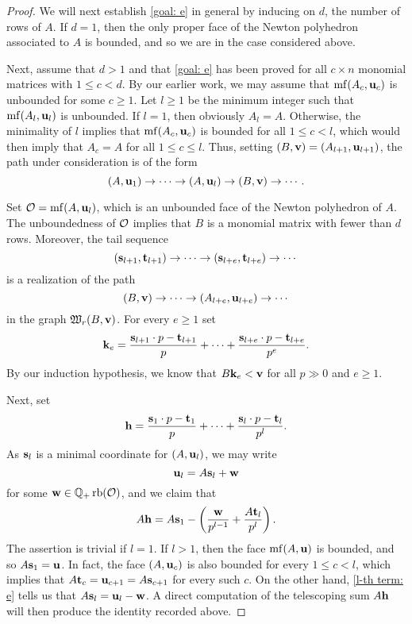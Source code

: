 \documentclass[11pt]{amsart}
\renewcommand{\!}[1]{{\color{red}\text{$\star$\,}#1\,$\star$}}
\begin{document}
\begin{proof}
We will next establish \eqref{goal: e} in general by inducing on $d$, the number of rows of $A$.    If $d=1$, then the only proper face of the Newton polyhedron associated to $A$ is bounded, and so we are in the case considered above.    

Next, assume that $d>1$ and that \eqref{goal: e} has been proved for all $c \times n$ monomial matrices with $1 \leq c < d$.    By our earlier work, we may assume that $\operatorname{mf}(A_c, \mathbf{u}_c)$ is unbounded for some $c \geq 1$.  Let $l \geq 1$ be the minimum integer such that $\operatorname{mf}(A_l, \mathbf{u}_l)$ is unbounded.  If $l=1$, then obviously $A_l = A$. Otherwise, the minimality of $l$ implies that $\operatorname{mf}(A_c, \mathbf{u}_c)$ is bounded for all $1 \leq c < l$, which would then imply that $A_c = A$ for all $1 \leq c \leq l$.  Thus, setting $(B, \mathbf{v}) = (A_{l+1}, \mathbf{u}_{l+1})$, the path under consideration is of the form \[ (A, \mathbf{u}_1) \to \cdots \to (A, \mathbf{u}_l) \to (B, \mathbf{v}) \to \cdots. \]

 Set  $\mathcal{O} = \operatorname{mf}(A, \mathbf{u}_l)$, which is an unbounded face of the Newton polyhedron of $A$.  The unboundedness of $\mathcal{O}$ implies that $B$  is a monomial matrix with fewer than $d$ rows.  Moreover, the tail sequence 
\[ (\mathbf{s}_{l+1}, \mathbf{t}_{l+1}) \to \cdots \to (\mathbf{s}_{l+e}, \mathbf{t}_{l+e}) \to \cdots \] is a realization of the path \[ (B, \mathbf{v}) \to \cdots \to (A_{l+e}, \mathbf{u}_{l+e}) \to \cdots \] in the graph $\mathfrak{W}_r(B, \mathbf{v})$.  For every $e \geq 1$ set \[ \mathbf{k}_e = \frac{ \mathbf{s}_{l+1} \cdot p - \mathbf{t}_{l+1}}{p} + \cdots + \frac{ \mathbf{s}_{l+e} \cdot p - \mathbf{t}_{l+e}}{p^e}.  \]   By our induction hypothesis, we know that $B \mathbf{k}_e < \mathbf{v}$ for all $p \gg 0$ and $e \geq 1$.

Next, set \[ \mathbf{h} = \frac{\mathbf{s}_1 \cdot p - \mathbf{t}_1}{p} + \cdots + \frac{ \mathbf{s}_l \cdot p - \mathbf{t}_l}{p^l}. \] 
As $\mathbf{s}_l$ is a minimal coordinate for $(A, \mathbf{u}_l)$, we may write 
%
\begin{equation}
 \label{l-th term: e}
 \mathbf{u}_l = A \mathbf{s}_l + \mathbf{w}
 \end{equation}
 for some $\mathbf{w} \in \mathbb{Q}_+ \operatorname{rb}(\mathcal{O})$, and we claim that   
\begin{equation} 
\label{A telescoping: e}
A \mathbf{h} = A \mathbf{s}_1 - \left( \frac{\mathbf{w}}{p^{l-1}} + \frac{A \mathbf{t}_l}{p^l} \right).  
\end{equation}  
The assertion is trivial if $l =1$.  If $l > 1$, then the face $\operatorname{mf}(A, \mathbf{u})$ is bounded, and so $A \mathbf{s}_1 = \mathbf{u}$.  In fact,  the face $(A, \mathbf{u}_c)$ is also bounded for every $1 \leq c < l$, which implies that $A \mathbf{t}_c = \mathbf{u}_{c+1} = A \mathbf{s}_{c+1}$ for every such $c$.  On the other hand, \eqref{l-th term: e} tells us that $A \mathbf{s}_l = \mathbf{u}_l - \mathbf{w}$.  A direct computation of the telescoping sum $A \mathbf{h}$ will then produce the identity recorded above.  


\end{proof}
\end{document}
